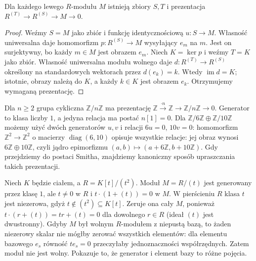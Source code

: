 \begin{twierdzenie}
\label{aa:tw:modules-presentation-exists}
Dla każdego lewego $R$-modułu $M$ istnieją zbiory
$S,T$ i prezentacja $R^{(T)}\to R^{(S)}\to M\to0$.
\end{twierdzenie}
\begin{proof}
Weźmy $S=M$ jako zbiór i funkcję identycznościową
$u:S\to M$. Własność uniwersalna daje homomorfizm
$p:R^{(S)}\to M$ wysyłający $e_m$ na $m$.
Jest on surjektywny, bo każdy $m\in M$ jest obrazem
$e_m$. Niech $K=\ker p$ i weźmy $T=K$ jako zbiór.
Własność uniwersalna modułu wolnego daje
$d:R^{(T)}\to R^{(S)}$ określony na standardowych
wektorach przez $d(e_k)=k$. Wtedy
$\operatorname{im}d=K$; istotnie, obrazy należą do $K$,
a każdy $k\in K$ jest obrazem $e_k$.
Otrzymujemy wymaganą prezentację.
\end{proof}

\begin{przyklad}
\label{aa:prz:modules-presentations-z}
Dla $n\ge2$ grupa cykliczna $\mathbb Z/n\mathbb Z$
ma prezentację
$\mathbb Z\xrightarrow{\cdot n}\mathbb Z\to\mathbb Z/n\mathbb Z\to0$.
Generator to klasa liczby $1$, a jedyna relacja
ma postać $n[1]=0$. Dla
$\mathbb Z/6\mathbb Z\oplus\mathbb Z/10\mathbb Z$
możemy użyć dwóch generatorów $u,v$ i relacji
$6u=0$, $10v=0$: homomorfizm
$\mathbb Z^2\to\mathbb Z^2$ o macierzy
$\operatorname{diag}(6,10)$ opisuje wszystkie relacje:
jej obraz wynosi $6\mathbb Z\oplus10\mathbb Z$,
czyli jądro epimorfizmu
$(a,b)\mapsto(a+6\mathbb Z,b+10\mathbb Z)$.
Gdy przejdziemy do postaci Smitha, znajdziemy
kanoniczny sposób upraszczania takich prezentacji.
\end{przyklad}

\begin{przyklad}
\label{aa:prz:modules-cyclic-not-free}
Niech $K$ będzie ciałem, a $R=K[t]/(t^2)$.
Moduł $M=R/(t)$ jest generowany przez klasę $1$,
ale $t\ne0$ w $R$ i $t\cdot(1+(t))=0$ w $M$.
W pierścieniu $R$ klasa $t$ jest niezerowa,
gdyż $t\notin(t^2)\subseteq K[t]$. Zeruje ona cały
$M$, ponieważ $t\cdot(r+(t))=tr+(t)=0$
dla dowolnego $r\in R$ (ideał $(t)$ jest dwustronny).
Gdyby $M$ był wolnym $R$-modułem z niepustą bazą,
to żaden niezerowy skalar nie mógłby zerować
wszystkich elementów: dla elementu bazowego $e_s$
równość $te_s=0$ przeczyłaby jednoznaczności
współrzędnych. Zatem moduł nie jest wolny. Pokazuje to, że generator
i element bazy to różne pojęcia.
\end{przyklad}

